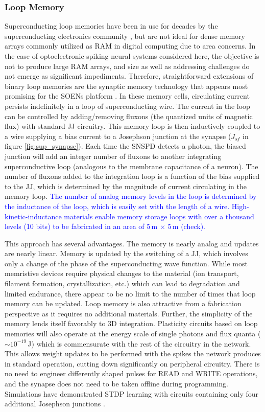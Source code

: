 \documentclass[twocolumn]{article}
\begin{document}
\subsubsection{Loop Memory}\label{Loops}
Superconducting loop memories have been in use for decades by the superconducting electronics community \cite{vatu1998,ka1999}, but are not ideal for dense memory arrays commonly utilized as RAM in digital computing due to area concerns. In the case of optoelectronic spiking neural systems considered here, the objective is not to produce large RAM arrays, and size as well as addressing challenges do not emerge as significant impediments. Therefore, straightforward extensions of binary loop memories are the synaptic memory technology that appears most promising for the SOENs platform \cite{sh2018,shainline2019superconducting}. In these memory cells, circulating current persists indefinitely in a loop of superconducting wire. The current in the loop can be controlled by adding/removing fluxons (the quantized units of magnetic flux) with standard JJ circuitry. This memory loop is then inductively coupled to a wire supplying a bias current to a Josephson junction at the synapse ($J_{sf}$ in figure \ref{fig:sup_synapse}). Each time the SNSPD detects a photon, the biased junction will add an integer number of fluxons to another integrating superconductive loop (analogous to the membrane capacitance of a neuron). The number of fluxons added to the integration loop is a function of the bias supplied to the JJ, which is determined by the magnitude of current circulating in the memory loop. \textcolor{blue}{The number of analog memory levels in the loop is determined by the inductance of the loop, which is easily set with the length of a wire. High-kinetic-inductance materials \cite{tobo2018} enable memory storage loops with over a thousand levels (10 bits) to be fabricated in an area of 5\,\textmu m $\times$ 5\,\textmu m (check).}

This approach has several advantages. The memory is nearly analog and updates are nearly linear. Memory is updated by the switching of a JJ, which involves only a change of the phase of the superconducting wave function. While most memristive devices require physical changes to the material (ion transport, filament formation, crystallization, etc.) which can lead to degradation and limited endurance, there appear to be no limit to the number of times that loop memory can be updated. Loop memory is also attractive from a fabrication perspective as it requires no additional materials. Further, the simplicity of the memory lends itself favorably to 3D integration. Plasticity circuits based on loop memories will also operate at the energy scale of single photons and flux quanta ($\sim 10^{-19}$\,J) which is commensurate with the rest of the circuitry in the network. This allows weight updates to be performed with the spikes the network produces in standard operation, cutting down significantly on peripheral circuitry. There is no need to engineer differently shaped pulses for READ and WRITE operations, and the synapse does not need to be taken offline during programming. Simulations have demonstrated STDP learning with circuits containing only four additional Josephson junctions \cite{shainline2019superconducting}. 
\end{document}
